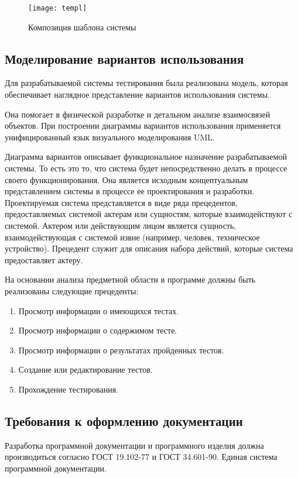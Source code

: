 \begin{figure}[ht]
\texttt{[image: templ]}
\caption{Композиция шаблона системы}
\label{templ:image}
\end{figure}

\subsection{Моделирование вариантов использования}

Для разрабатываемой системы тестирования была реализована модель, которая обеспечивает наглядное представление вариантов использования системы.

Она помогает в физической разработке и детальном анализе взаимосвязей объектов. При построении диаграммы вариантов использования применяется унифицированный язык визуального моделирования UML.

Диаграмма вариантов описывает функциональное назначение разрабатываемой системы. То есть это то, что система будет непосредственно делать в процессе своего функционирования. Она является исходным концептуальным представлением системы в процессе ее проектирования и разработки. Проектируемая система представляется в виде ряда прецедентов, предоставляемых системой актерам или сущностям, которые взаимодействуют с системой. Актером или действующим лицом является сущность, взаимодействующая с системой извне (например, человек, техническое устройство). Прецедент служит для описания набора действий, которые система предоставляет актеру.

На основании анализа предметной области в программе должны быть реализованы следующие прецеденты:
\begin{enumerate}
\item Просмотр информации о имеющихся тестах.
\item Просмотр информации о содержимом тесте.
\item Просмотр информации о результатах пройденных тестов.
\item Создание или редактирование тестов.
\item Прохождение тестирования.
\end{enumerate}

\subsection{Требования к оформлению документации}

Разработка программной документации и программного изделия должна производиться согласно ГОСТ 19.102-77 и ГОСТ 34.601-90. Единая система программной документации.
